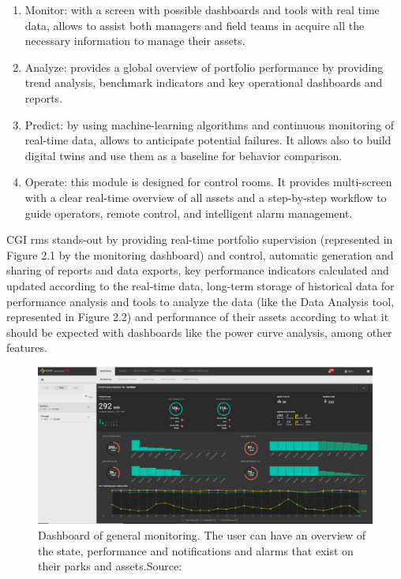 \begin{enumerate}
\item
Monitor: with a screen with possible dashboards and tools with real time data, allows to assist both managers and field teams in acquire all the necessary information to manage their assets.

\item
Analyze: provides a global overview of portfolio performance by providing trend analysis, benchmark indicators and key operational dashboards and reports.

\item
Predict: by using machine-learning algorithms and continuous monitoring of real-time data, allows to anticipate potential failures. It allows also to build digital twins and use them as a baseline for behavior comparison.

\item
Operate: this module is designed for control rooms. It provides multi-screen with a clear real-time overview of all assets and a step-by-step workflow to guide operators, remote control, and intelligent alarm management.
\end{enumerate}

CGI \acrshort{rms} stands-out by providing real-time portfolio supervision (represented in Figure 2.1 by the monitoring dashboard) and control, automatic generation and sharing of reports and data exports, key performance indicators calculated and updated according to the real-time data, long-term storage of historical data for performance analysis and tools to analyze the data (like the Data Analysis tool, represented in Figure 2.2) and performance of their assets according to what it should be expected with dashboards like the power curve analysis, among other features.

\begin{figure}[htbp]
	\centering
	\includegraphics[width=\textwidth]{Chapters/Figures/background_fig2.PNG}
	\caption{Dashboard of general monitoring. The user can have an overview of the state, performance and notifications and alarms that exist on their parks and assets.Source: \cite{CGIRMS} }
	\label{fig:Figuras_Tree_silhouettes-vectorial}
\end{figure}


